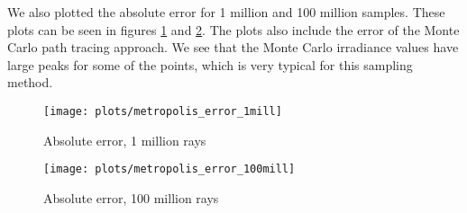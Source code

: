 \documentclass{article} %
\begin{document}
We also plotted the absolute error for 1 million and 100 million samples. These plots can be seen in figures \ref{fig:metropolis_error1} and \ref{fig:metropolis_error100}. The plots also include the error of the Monte Carlo path tracing approach. We see that the Monte Carlo irradiance values have large peaks for some of the points, which is very typical for this sampling method.

\begin{figure}
    \centering
    \texttt{[image: plots/metropolis\_error\_1mill]}\\
    \caption{Absolute error, 1 million rays}
    \label{fig:metropolis_error1}
\end{figure}

\begin{figure}
    \centering
    \texttt{[image: plots/metropolis\_error\_100mill]}\\
    \caption{Absolute error, 100 million rays}
    \label{fig:metropolis_error100}
\end{figure}
\end{document}
